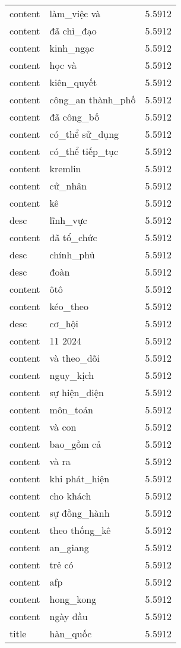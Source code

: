 \documentclass{article}
\begin{document}
\begin{tabular}{lll}
content & làm\_việc và & 5.5912\\
content & đã chỉ\_đạo & 5.5912\\
content & kinh\_ngạc & 5.5912\\
content & học và & 5.5912\\
content & kiên\_quyết & 5.5912\\
content & công\_an thành\_phố & 5.5912\\
content & đã công\_bố & 5.5912\\
content & có\_thể sử\_dụng & 5.5912\\
content & có\_thể tiếp\_tục & 5.5912\\
content & kremlin & 5.5912\\
content & cử\_nhân & 5.5912\\
content & kê & 5.5912\\
desc & lĩnh\_vực & 5.5912\\
content & đã tổ\_chức & 5.5912\\
desc & chính\_phủ & 5.5912\\
desc & đoàn & 5.5912\\
content & ôtô & 5.5912\\
content & kéo\_theo & 5.5912\\
desc & cơ\_hội & 5.5912\\
content & 11 2024 & 5.5912\\
content & và theo\_dõi & 5.5912\\
content & nguy\_kịch & 5.5912\\
content & sự hiện\_diện & 5.5912\\
content & môn\_toán & 5.5912\\
content & và con & 5.5912\\
content & bao\_gồm cả & 5.5912\\
content & và ra & 5.5912\\
content & khi phát\_hiện & 5.5912\\
content & cho khách & 5.5912\\
content & sự đồng\_hành & 5.5912\\
content & theo thống\_kê & 5.5912\\
content & an\_giang & 5.5912\\
content & trẻ có & 5.5912\\
content & afp & 5.5912\\
content & hong\_kong & 5.5912\\
content & ngày đầu & 5.5912\\
title & hàn\_quốc & 5.5912\\

\end{tabular}
\end{document}
